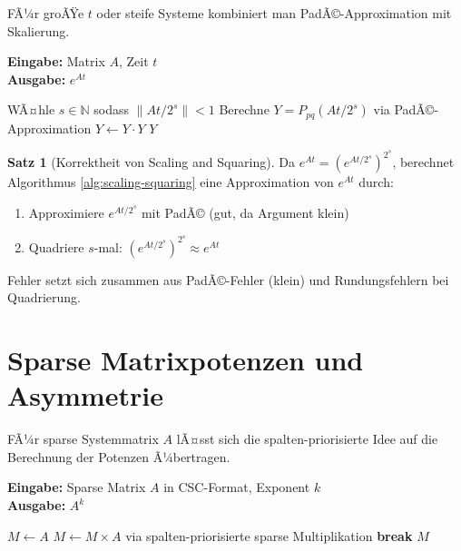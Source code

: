 ﻿\documentclass[a4paper,12pt]{report}
\theoremstyle{definition}
\newtheorem{satz}{Satz}
\begin{document}
	FÃ¼r groÃŸe $t$ oder steife Systeme kombiniert man PadÃ©-Approximation mit Skalierung.
	
	\begin{algorithm}[H]
		\caption{Scaling and Squaring fÃ¼r Matrixexponential}
		\label{alg:scaling-squaring}
		\textbf{Eingabe:} Matrix $A$, Zeit $t$ \\
		\textbf{Ausgabe:} $e^{At}$
		\begin{algorithmic}[1]
			\State WÃ¤hle $s \in \mathbb{N}$ sodass $\|At/2^s\| < 1$
			\State Berechne $Y = P_{pq}(At/2^s)$ via PadÃ©-Approximation
			\State $Y \gets Y \cdot Y$ 
			\EndFor
			\State \Return $Y$
		\end{algorithmic}
	\end{algorithm}
	
	\begin{satz}[Korrektheit von Scaling and Squaring]
		Da $e^{At} = (e^{At/2^s})^{2^s}$, berechnet Algorithmus \ref{alg:scaling-squaring} eine Approximation von $e^{At}$ durch:
		\begin{enumerate}
			\item Approximiere $e^{At/2^s}$ mit PadÃ© (gut, da Argument klein)
			\item Quadriere $s$-mal: $(e^{At/2^s})^{2^s} \approx e^{At}$
		\end{enumerate}
		
		Fehler setzt sich zusammen aus PadÃ©-Fehler (klein) und Rundungsfehlern bei Quadrierung.
	\end{satz}
	
	\section{Sparse Matrixpotenzen und Asymmetrie}
	
	FÃ¼r sparse Systemmatrix $A$ lÃ¤sst sich die spalten-priorisierte Idee auf die Berechnung der Potenzen Ã¼bertragen.
	
	\begin{algorithm}[H]
		\caption{Sparse Matrixpotenz-Berechnung}
		\label{alg:sparse-matrix-power}
		\textbf{Eingabe:} Sparse Matrix $A$ in CSC-Format, Exponent $k$ \\
		\textbf{Ausgabe:} $A^k$
		\begin{algorithmic}[1]
			\State $M \gets A$
			\State $M \gets M \times A$ via spalten-priorisierte sparse Multiplikation
			\State \textbf{break} 
			\EndIf
			\EndFor
			\State \Return $M$
		\end{algorithmic}
	\end{algorithm}
	
\end{document}
